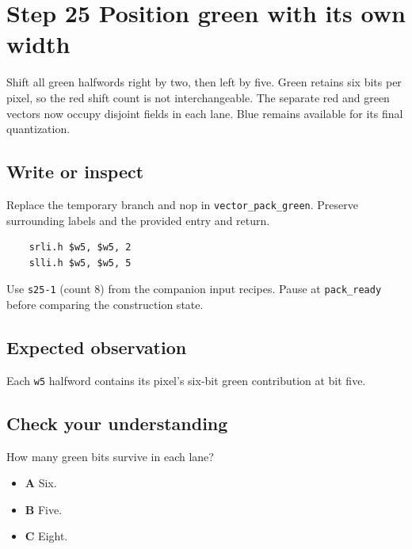 \section{Step 25 Position green with its own width}\label{rgb-s25}

Shift all green halfwords right by two, then left by five. Green retains six bits per pixel, so the red shift count is not interchangeable. The separate red and green vectors now occupy disjoint fields in each lane. Blue remains available for its final quantization.

\subsection{Write or inspect}
Replace the temporary branch and nop in \texttt{vector\_pack\_green}. Preserve surrounding labels and the provided entry and return.

\begin{verbatim}
    srli.h $w5, $w5, 2
    slli.h $w5, $w5, 5
\end{verbatim}
Use \texttt{s25-1} (count 8) from the companion input recipes. Pause at \texttt{pack\_ready} before comparing the construction state.

\subsection{Expected observation}
Each \texttt{w5} halfword contains its pixel's six-bit green contribution at bit five.

\subsection{Check your understanding}
How many green bits survive in each lane?

\begin{itemize}
  \item \textbf{A} Six.
  \item \textbf{B} Five.
  \item \textbf{C} Eight.
\end{itemize}
